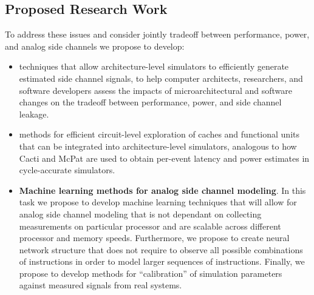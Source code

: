 \documentclass[11 pt]{article}
\begin{document}
\subsection{Proposed Research Work}
To address these issues and consider jointly tradeoff between performance, power, and analog side channels we propose to develop:
\begin{itemize}
\item techniques that allow architecture-level simulators to efficiently generate estimated side channel signals, to help computer architects, researchers, and software developers assess the impacts of microarchitectural and software changes on the tradeoff between performance, power, and side channel leakage.
\item methods for efficient circuit-level exploration of caches and functional units that can be integrated into architecture-level simulators, analogous to how Cacti and McPat are used to obtain per-event latency and power estimates in cycle-accurate simulators.
\item \textbf{Machine learning methods for analog side channel modeling}. In this task we propose to develop machine learning techniques that will allow for analog side channel modeling that is not dependant on collecting measurements on particular processor and are scalable across different processor and memory speeds. Furthermore, we propose to create neural network structure that does not require to observe all possible combinations of instructions in order to model larger sequences of instructions. Finally, we propose to develop methods for ``calibration'' of simulation parameters against measured signals from real systems.
 \end{itemize}
\end{document}
